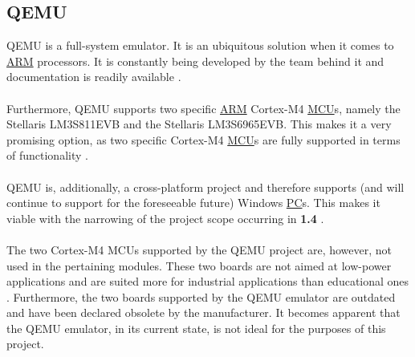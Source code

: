 \subsection{QEMU}
\label{qemu}
QEMU is a full-system emulator. It is an ubiquitous solution when it comes to \hyperref[listAbr]{ARM} processors. It is constantly being developed by the team behind it and documentation is readily available \cite{QEMU}.
\\\\
Furthermore, QEMU supports two specific \hyperref[listAbr]{ARM} Cortex-M4  \hyperref[listAbr]{MCU}s, namely the Stellaris LM3S811EVB and the Stellaris LM3S6965EVB. This makes it a very promising option, as two specific Cortex-M4 \hyperref[listAbr]{MCU}s are fully supported in terms of functionality \cite{QEMU}\cite{QEMUarm}.
\\\\
QEMU is, additionally, a cross-platform project and therefore supports (and will continue to support for the foreseeable future) Windows \hyperref[listAbr]{PC}s. This makes it viable with the narrowing of the project scope occurring in \textbf{1.4 }. 
\\\\
The two Cortex-M4 MCUs supported by the QEMU project are, however, not used in the pertaining modules. These two boards are not aimed at low-power applications and are suited more for industrial applications than educational ones \cite{TexasInstruments2014}. Furthermore, the two boards supported by the QEMU emulator are outdated and have been declared obsolete by the manufacturer. It becomes apparent that the QEMU emulator, in its current state, is not ideal for the purposes of this project. 
%

